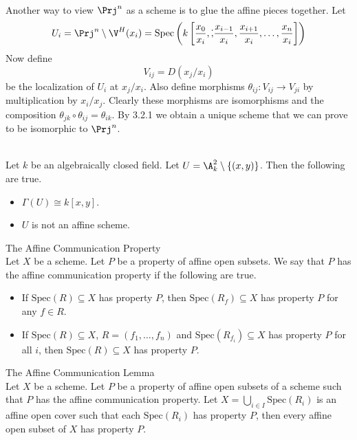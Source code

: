 \documentclass[a4paper]{article}
\begin{document}
\begin{eg}{}{}\\
Another way to view $\Prj^n$ as a scheme is to glue the affine pieces together. Let $$U_i=\Prj^n\setminus\V^H(x_i)=\text{Spec}\left(k\left[\frac{x_0}{x_i},\dot,\frac{x_{i-1}}{x_i},\frac{x_{i+1}}{x_i},\dots,\frac{x_n}{x_i}\right]\right)$$ Now define $$V_{ij}=D(x_j/x_i)$$ be the localization of $U_i$ at $x_j/x_i$. Also define morphisms $\theta_{ij}:V_{ij}\to V_{ji}$ by multiplication by $x_i/x_j$. Clearly these morphisms are isomorphisms and the composition $\theta_{jk}\circ\theta_{ij}=\theta_{ik}$. By 3.2.1 we obtain a unique scheme that we can prove to be isomorphic to $\Prj^n$. 
\end{eg}

\begin{eg}{}{}\\
Let $k$ be an algebraically closed field. Let $U=\A_k^2\setminus\{(x,y)\}$. Then the following are true. 
\begin{itemize}
\item $\Gamma(U)\cong k[x,y]$. 
\item $U$ is not an affine scheme. 
\end{itemize}
\end{eg}

\begin{defn}{The Affine Communication Property}{}\\
Let $X$ be a scheme. Let $P$ be a property of affine open subsets. We say that $P$ has the affine communication property if the following are true. 
\begin{itemize}
\item If $\text{Spec}(R)\subseteq X$ has property $P$, then $\text{Spec}(R_f)\subseteq X$ has property $P$ for any $f\in R$. 
\item If $\text{Spec}(R)\subseteq X$, $R=(f_1,\dots,f_n)$ and $\text{Spec}(R_{f_i})\subseteq X$ has property $P$ for all $i$, then $\text{Spec}(R)\subseteq X$ has property $P$. 
\end{itemize}
\end{defn}

\begin{thm}{The Affine Communication Lemma}{}\\
Let $X$ be a scheme. Let $P$ be a property of affine open subsets of a scheme such that $P$ has the affine communication property. Let $X=\bigcup_{i\in I}\text{Spec}(R_i)$ is an affine open cover such that each $\text{Spec}(R_i)$ has property $P$, then every affine open subset of $X$ has property $P$. 
\end{thm}
\end{document}
